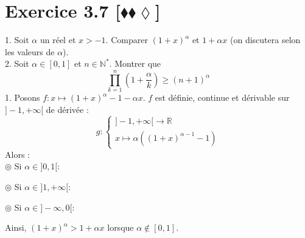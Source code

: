 \documentclass[10pt]{article}
\begin{document}
\section*{Exercice 3.7 [$\blacklozenge\blacklozenge\lozenge$]}
\begin{tcolorbox}[enhanced, width=6in, center, size=fbox, fontupper=\large, drop shadow southwest]
    1. Soit $\alpha$ un réel et $x>-1$. Comparer $(1+x)^\alpha$ et $1+\alpha x$ (on discutera selon les valeurs de $\alpha$).\\
    2. Soit $\alpha\in[0,1]$ et $n\in\mathbb{N}^*$. Montrer que
    \begin{equation*}
        \prod_{k=1}^n{\left(1+\frac{\alpha}{k}\right)}\geq(n+1)^\alpha
    \end{equation*}
    1. Posons $f:x\mapsto(1+x)^\alpha-1-\alpha x$. $f$ est définie, continue et dérivable sur $]-1,+\infty[$ de dérivée :
    \begin{equation*}
        g:\begin{cases}]-1,+\infty[\rightarrow\mathbb{R}\\x\mapsto\alpha((1+x)^{\alpha-1}-1)\end{cases}
    \end{equation*}
    Alors :\\
    $\circledcirc$ Si $\alpha\in]0,1[$:
    \begin{center}
    \end{center}
    $\circledcirc$ Si $\alpha\in]1,+\infty[$:
    \begin{center}
    \end{center}
    $\circledcirc$ Si $\alpha\in]-\infty,0[$:
    \begin{center}
    \end{center}
    Ainsi, $(1+x)^\alpha > 1+\alpha x$ lorsque $\alpha\notin[0,1]$.
\end{tcolorbox}
\end{document}
